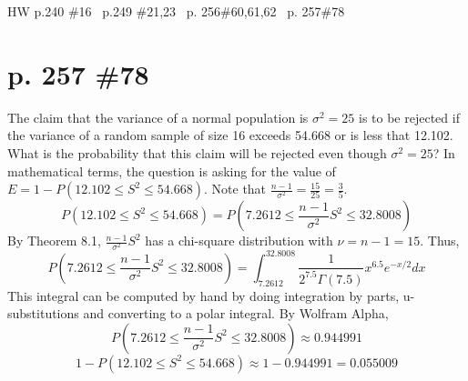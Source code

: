 \documentclass[12pt]{article}
\begin{document}
\maketitle HW p.240 \#16 \ p.249 \#21,23 \ p. 256\#60,61,62 \ p. 257\#78
\section[20pt]{p. 257 \#78}
The claim that the variance of a normal population is \(\sigma^2=25\) is to be rejected if the variance of a random sample of size 16 exceeds 54.668 or is less that 12.102. What is the probability that this claim will be rejected even though \(\sigma^2=25\)?
\newline \newline
In mathematical terms, the question is asking for the value of \(E= 1 - P(12.102 \leq S^2 \leq 54.668)\).
\newline
Note that \(\frac{n-1}{\sigma^2}=\frac{15}{25}=\frac{3}{5}\).
\[P(12.102 \leq S^2 \leq 54.668)=P(7.2612 \leq \frac{n-1}{\sigma^2}S^2 \leq 32.8008)\]
By Theorem 8.1, \(\frac{n-1}{\sigma^2}S^2\) has a chi-square distribution with \(\nu = n-1 = 15\). Thus,
\[P(7.2612 \leq \frac{n-1}{\sigma^2}S^2 \leq 32.8008)=\int_{7.2612}^{32.8008}\frac{1}{2^{7.5}\Gamma(7.5)}x^{6.5}e^{-x/2}dx\]
This integral can be computed by hand by doing integration by parts, u-substitutions and converting to a polar integral. By Wolfram Alpha,
\[P(7.2612 \leq \frac{n-1}{\sigma^2}S^2 \leq 32.8008)\approx 0.944991\]
\[1 - P(12.102 \leq S^2 \leq 54.668)\approx1-0.944991=0.055009\]
\end{document}
